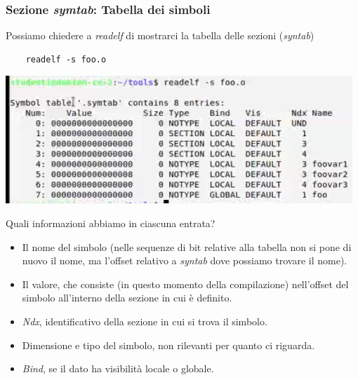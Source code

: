 \subsubsection{Sezione \emph{symtab}: Tabella dei simboli} Possiamo chiedere a \emph{readelf} di mostrarci la tabella delle sezioni (\emph{syntab})
\begin{verbatim}
	readelf -s foo.o
\end{verbatim}
\begin{center}
	\includegraphics{img/55.PNG}
\end{center}  
Quali informazioni abbiamo in ciascuna entrata?
\begin{itemize}
	\item Il nome del simbolo (nelle sequenze di bit relative alla tabella non si pone di nuovo il nome, ma l'offset relativo a \emph{syntab} dove possiamo trovare il nome).
	\item Il valore, che consiste (in questo momento della compilazione) nell'offset del simbolo all'interno della sezione in cui è definito.
	\item \emph{Ndx}, identificativo della sezione in cui si trova il simbolo.
	\item Dimensione e tipo del simbolo, non rilevanti per quanto ci riguarda.
	\item \emph{Bind}, se il dato ha visibilità locale o globale.
\end{itemize}
